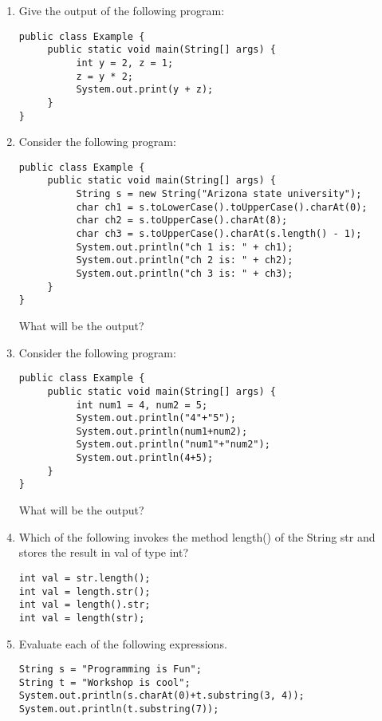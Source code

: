 \setcounter{counter}{1}
\begin{enumerate}[label={\arabic{counter}\addtocounter{counter}{1}}.]

\item Give the output of the following program:
\begin{lstlisting}
public class Example {
     public static void main(String[] args) {
          int y = 2, z = 1;
          z = y * 2;
          System.out.print(y + z);
     }
}
\end{lstlisting}

\item Consider the following program:
\begin{lstlisting}
public class Example {
     public static void main(String[] args) {
          String s = new String("Arizona state university");
          char ch1 = s.toLowerCase().toUpperCase().charAt(0);
          char ch2 = s.toUpperCase().charAt(8);
          char ch3 = s.toUpperCase().charAt(s.length() - 1);
          System.out.println("ch 1 is: " + ch1);
          System.out.println("ch 2 is: " + ch2);
          System.out.println("ch 3 is: " + ch3);
     }
}
\end{lstlisting}
What will be the output?

\item Consider the following program:
\begin{lstlisting}
public class Example {
     public static void main(String[] args) {
          int num1 = 4, num2 = 5;
          System.out.println("4"+"5");
          System.out.println(num1+num2);
          System.out.println("num1"+"num2");
          System.out.println(4+5);
     }
}
\end{lstlisting}
What will be the output?

\item Which of the following invokes the method length() of the String str and stores the result in val of type int?
\begin{lstlisting}
int val = str.length();
int val = length.str();
int val = length().str;
int val = length(str);
\end{lstlisting}

\item Evaluate each of the following expressions.
\begin{lstlisting}
String s = "Programming is Fun";
String t = "Workshop is cool";
System.out.println(s.charAt(0)+t.substring(3, 4));
System.out.println(t.substring(7));
\end{lstlisting}


\end{enumerate}
